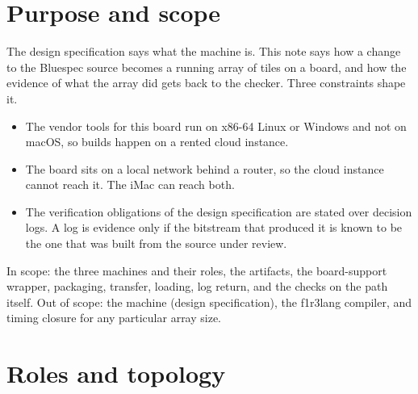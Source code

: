 \section{Purpose and scope}

The design specification says what the machine is. This note says how a
change to the Bluespec source becomes a running array of tiles on a board,
and how the evidence of what the array did gets back to the checker. Three
constraints shape it.
\begin{itemize}
\item The vendor tools for this board run on x86-64 Linux or Windows and not
on macOS, so builds happen on a rented cloud instance.
\item The board sits on a local network behind a router, so the cloud
instance cannot reach it. The iMac can reach both.
\item The verification obligations of the design specification are stated
over decision logs. A log is evidence only if the bitstream that produced it
is known to be the one that was built from the source under review.
\end{itemize}
In scope: the three machines and their roles, the artifacts, the
board-support wrapper, packaging, transfer, loading, log return, and the
checks on the path itself. Out of scope: the machine (design specification),
the f1r3lang compiler, and timing closure for any particular array size.

\section{Roles and topology}\label{sec:roles}

